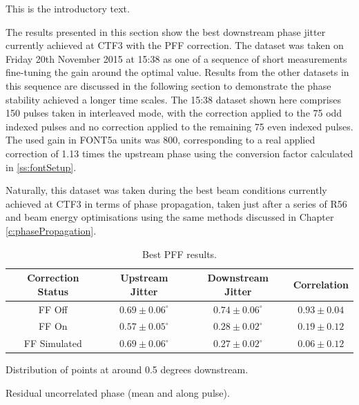 
This is the introductory text.




The results presented in this section show the best downstream phase jitter currently achieved at CTF3 with the PFF correction. The dataset was taken on Friday 20th November 2015 at 15:38 as one of a sequence of short measurements fine-tuning the gain around the optimal value. Results from the other datasets in this sequence are discussed in the following section to demonstrate the phase stability achieved a longer time scales. The 15:38 dataset shown here comprises 150 pulses taken in interleaved mode, with the correction applied to the 75 odd indexed pulses and no correction applied to the remaining 75 even indexed pulses. The used gain in FONT5a units was 800, corresponding to a real applied correction of 1.13 times the upstream phase using the conversion factor calculated in \ref{ss:fontSetup}.

Naturally, this dataset was taken during the best beam conditions currently achieved at CTF3 in terms of phase propagation, taken just after a series of R56 and beam energy optimisations using the same methods discussed in Chapter \ref{c:phasePropagation}.

\begin{table}
  \begin{center}
    \begin{tabular}{| c | c | c | c |}
	   \hline
       Correction Status & Upstream Jitter & Downstream Jitter & Correlation \\ \hline
       FF Off & \(0.69\pm0.06^\circ\) & \(0.74\pm0.06^\circ\) & \(0.93\pm0.04\) \\
	   FF On & \(0.57\pm0.05^\circ\) & \(0.28\pm0.02^\circ\) & \(0.19\pm0.12\) \\
	   FF Simulated & \(0.69\pm0.06^\circ\) & \(0.27\pm0.02^\circ\) & \(0.06\pm0.12\) \\ \hline
    \end{tabular}
    \caption{Best PFF results.}
  	\label{t:BestFF}
  \end{center}
\end{table}

Distribution of points at around 0.5 degrees downstream.

Residual uncorrelated phase (mean and along pulse).

